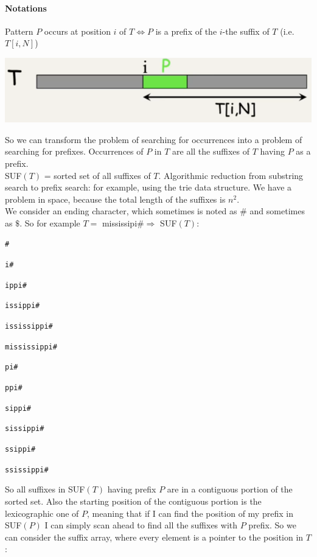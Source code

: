 \documentclass[10pt]{report}
\begin{document}
\paragraph{Notations} Pattern $P$ occurs at position $i$ of $T\Leftrightarrow P$ is a prefix of the $i$-the suffix of $T$ (i.e. $T[i,N]$)\begin{center}
	\includegraphics[scale=0.75]{19.png}
\end{center}
So we can transform the problem of searching for occurrences into a problem of searching for prefixes. Occurrences of $P$ in $T$ are all the suffixes of $T$ having $P$ as a prefix.\\
SUF$(T)$ = sorted set of all suffixes of $T$. Algorithmic reduction from substring search to prefix search: for example, using the trie data structure. We have a problem in space, because the total length of the suffixes is $n^2$.\\
We consider an ending character, which sometimes is noted as $\#$ and sometimes as $\$$. So for example $T =$ mississipi$\# \Rightarrow$ SUF$(T)$:
\begin{multicols}{2}
\begin{list}{}{}
	\item \texttt{\#}
	\item \texttt{i\#}
	\item \texttt{ippi\#}
	\item \texttt{issippi\#}
	\item \texttt{ississippi\#}
	\item \texttt{mississippi\#}
	\item \texttt{pi\#}
	\item \texttt{ppi\#}
	\item \texttt{sippi\#}
	\item \texttt{sissippi\#}
	\item \texttt{ssippi\#}
	\item \texttt{ssissippi\#}
\end{list}
\end{multicols}
So all suffixes in SUF$(T)$ having prefix $P$ are in a contiguous portion of the sorted set. Also the starting position of the contiguous portion is the lexicographic one of $P$, meaning that if I can find the position of my prefix in SUF$(P)$ I can simply scan ahead to find all the suffixes with $P$ prefix. So we can consider the suffix array, where every element is a pointer to the position in $T$:
\end{document}
